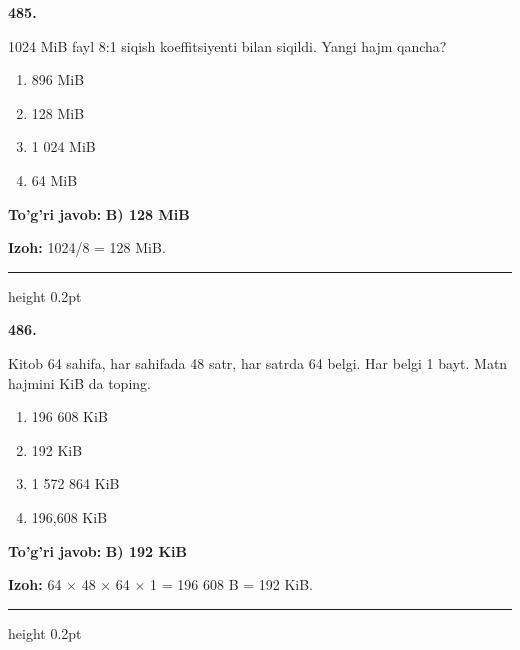 \documentclass[10pt,a4paper,oneside]{article}
\begin{document}
\noindent\textbf{\color{ink}485.}
\par
1024 MiB fayl 8:1 siqish koeffitsiyenti bilan siqildi. Yangi hajm qancha?
\begin{enumerate}[label=\Alph*),leftmargin=9mm]
\item 896 MiB
\item 128 MiB
\item 1 024 MiB
\item 64 MiB
\end{enumerate}
\begin{tcolorbox}[enhanced,breakable,colback=teal!4,colframe=teal!50!black,boxrule=0.5pt,arc=1.1mm,left=3mm,right=3mm,top=1.7mm,bottom=1.7mm,before skip=2mm,after skip=2mm]
\textbf{\color{teal}To'g'ri javob:} \textbf{B) 128 MiB}
\par\smallskip
\textbf{Izoh:} 1024/8 = 128 MiB.
\end{tcolorbox}
\vspace{2mm}\hrule height 0.2pt \vspace{3mm}

\noindent\textbf{\color{ink}486.}
\par
Kitob 64 sahifa, har sahifada 48 satr, har satrda 64 belgi. Har belgi 1 bayt. Matn hajmini KiB da toping.
\begin{enumerate}[label=\Alph*),leftmargin=9mm]
\item 196 608 KiB
\item 192 KiB
\item 1 572 864 KiB
\item 196,608 KiB
\end{enumerate}
\begin{tcolorbox}[enhanced,breakable,colback=teal!4,colframe=teal!50!black,boxrule=0.5pt,arc=1.1mm,left=3mm,right=3mm,top=1.7mm,bottom=1.7mm,before skip=2mm,after skip=2mm]
\textbf{\color{teal}To'g'ri javob:} \textbf{B) 192 KiB}
\par\smallskip
\textbf{Izoh:} 64 \ensuremath{\times} 48 \ensuremath{\times} 64 \ensuremath{\times} 1 = 196 608 B = 192 KiB.
\end{tcolorbox}
\vspace{2mm}\hrule height 0.2pt \vspace{3mm}
\end{document}
